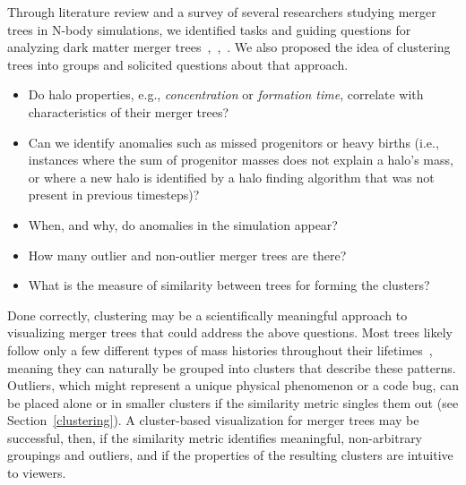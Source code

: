 Through literature review and a survey of several researchers studying merger trees in N-body simulations, we identified tasks and guiding questions for analyzing dark matter merger trees~\cite{hacc},~\cite{masshistory},~\cite{lacey1992}. We also proposed the idea of clustering trees into groups and solicited questions about that approach.
\begin{itemize}
\item{Do halo properties, e.g., \textit{concentration} or \textit{formation time}, correlate with characteristics of their merger trees?} %
\item{Can we identify anomalies such as missed progenitors or heavy births (i.e., instances where the sum of progenitor masses does not explain a halo's mass, or where a new halo is identified by a halo finding algorithm that was not present in previous timesteps)?}
\item{When, and why, do anomalies in the simulation appear?} %
\item{How many outlier and non-outlier merger trees are there?}
\item{What is the measure of similarity between trees for forming the clusters?}
\end{itemize}

Done correctly, clustering may be a scientifically meaningful approach to visualizing merger trees that could address the above questions. Most trees likely follow only a few different types of mass histories throughout their lifetimes~\cite{masshistory}, meaning they can naturally be grouped into clusters that describe these patterns. Outliers, which might represent a unique physical phenomenon or a code bug, can be placed alone or in smaller clusters if the similarity metric singles them out (see Section~\ref{clustering}). A cluster-based visualization for merger trees may be successful, then, if the similarity metric identifies meaningful, non-arbitrary groupings and outliers, and if the properties of the resulting clusters are intuitive to viewers.

